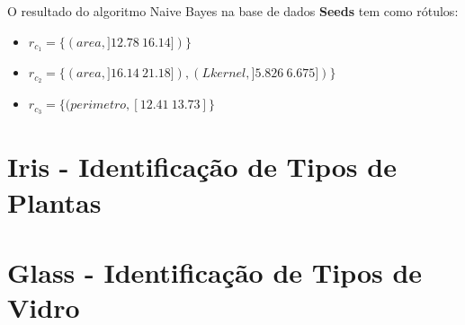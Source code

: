 O resultado do algoritmo Naive Bayes na base de dados \textbf{Seeds} tem como rótulos: 
\begin{itemize}[noitemsep]
 \item ${r_{c_1}=\{ (area, ]12.78 ~ 16.14]) \} }$  
 \item ${r_{c_2}=\{ (area, ]16.14 ~ 21.18]), (Lkernel, ]5.826 ~ 6.675]) \} }$
 \item ${r_{c_3}=\{ (perimetro, [12.41 ~ 13.73]\} }$
\end{itemize}


\section{Iris - Identificação de Tipos de Plantas}



 

  
 

\section{Glass - Identificação de Tipos de Vidro}
